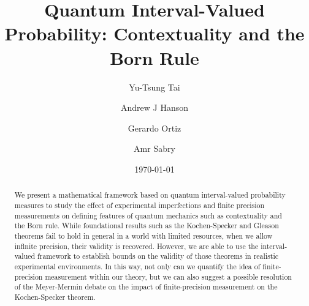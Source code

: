 \documentclass[english,reprint, aps, prl,superscriptaddress, showpacs,
showkeys, longbibliography, amsmath, amssymb]{revtex4-1}
\theoremstyle{plain}
\theoremstyle{definition}
\begin{document}
\title{Quantum Interval-Valued Probability: Contextuality and the Born Rule}

\author{Yu-Tsung Tai}

\author{Andrew J Hanson}

\author{Gerardo Ortiz}

\author{Amr Sabry}

\date{\today}

\begin{abstract}

We present a mathematical framework based on quantum interval-valued
probability measures to study the effect of experimental imperfections
and finite precision measurements on defining features of quantum
mechanics such as contextuality and the Born rule. While foundational
results such as the Kochen-Specker and Gleason theorems fail to hold
in general in a world with limited resources, when we allow infinite
precision, their validity is recovered.  However, we are able to use
the interval-valued framework to establish bounds on the validity of
those theorems in realistic experimental environments. In this way,
not only can we quantify the idea of finite-precision measurement
within our theory, but we can also suggest a possible resolution of
the Meyer-Mermin debate on the impact of finite-precision measurement
on the Kochen-Specker theorem.


\end{abstract}



\maketitle

\end{document}
